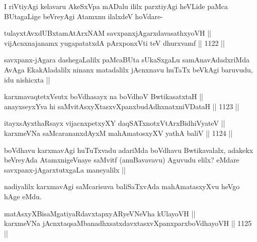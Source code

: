 \begin{artha}
I riVtiyAgi kelavaru AkeSxVpa mADalu ililx parxtiyAgi heVLide paMca BUtagaLige beVreyAgi Atamxnu ilalxdeV hoVdare-
\end{artha}

\begin{shl}
tulayxtAvxdUBxtamAtArxNAM savxpanxjAgarxdavasathxyoVH || \\
vijAcnxnajanamx yugapatatxdA pArxponxVti teV dhurxvamf ||  1122 ||  
\end{shl}

\begin{artha}
savxpanx-jAgara dashegaLalilx paMcaBUta sUkaSxgaLu samAnavAdadxriMda 
AvAga EkakAladalilx ninanx matadalilx jAcnxnavu huTaTx beVkAgi baruvudu, idu nishicxta ||
\end{artha}


\begin{shl}
karxmavaqtetxVsutx boVdhasayx na boVdhoV BwtikasatxtaH || \\
anayxseyxYva hi saMvitAsxyXtasxvXpanxbudAdhxnatxniVDataH ||  1123 || 
\end{shl}
				
\begin{shl}
itayxsAyxthaRsayx vijacnxpetxyXY daqSATxnotxV\s tArxBidhiVyateV ||  \\
karxmeVNa saMcarananxdAyxM mahAmatosxyXV yathA baliV ||  1124 ||  
\end{shl}

\begin{artha}
boVdhavu karxmavAgi huTuTxvadu adariMda boVdhavu Bwtikavalalx, adakekx beVreyAda AtamxnigeVnaye saMvitf (anuBavavavu) Aguvudu elilx? eMdare savxpanx-jAgarxtutxgaLa maneyalilx ||
\end{artha}


\begin{artha}
nadiyalilx karxmavAgi saMcarisuva baliSaTxvAda mahAmatasxyXvu heVgo hAge eMdu.
\end{artha}

\begin{shl}
matAsxyXBisaMgatiyaRdavxtapxyARyeVNeVha kUlayoVH || \\
karxmeVNa jAcnxtaqsaMbanadhxsatxdavxtasxvXpanxparxboVdhayoVH ||  1125 ||  
\end{shl}

